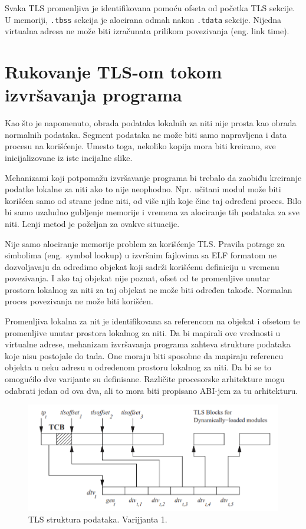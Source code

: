\documentclass[12pt,oneside]{memoir}
\begin{document}
Svaka TLS promenljiva je identifikovana pomoću ofseta od početka TLS sekcije. U memoriji,
\texttt{.tbss} sekcija je alocirana odmah nakon \texttt{.tdata} sekcije. Nijedna virtualna adresa ne
može biti izračunata prilikom povezivanja (eng. link time).

\section{Rukovanje TLS-om tokom izvršavanja programa}

Kao što je napomenuto, obrada podataka lokalnih za niti nije prosta kao obrada normalnih podataka. Segment podataka ne može biti samo napravljena i data procesu na korišćenje. Umesto toga, nekoliko kopija mora biti kreirano, sve inicijalizovane iz iste incijalne slike.

Mehanizami koji potpomažu izvršavanje programa bi trebalo da zaobiđu kreiranje podatke lokalne za niti ako to nije neophodno. Npr. učitani modul može biti korišćen samo od strane jedne niti, od više njih koje čine taj određeni proces. Bilo bi samo uzaludno gubljenje memorije i vremena za alociranje tih podataka za sve niti. Lenji metod je poželjan za ovakve situacije.

Nije samo alociranje memorije problem za korišćenje TLS. Pravila potrage za simbolima (eng.~symbol lookup) u izvršnim fajlovima sa ELF formatom ne dozvoljavaju da odredimo objekat koji sadrži korišćenu definiciju u vremenu povezivanja. I ako taj objekat nije poznat, ofset od te promenljive unutar prostora lokalnog za niti za taj objekat ne može biti određen takođe. Normalan proces povezivanja ne može biti korišćen.

Promenljiva lokalna za nit je identifikovana sa referencom na objekat i ofsetom te promenljive unutar prostora lokalnog za niti. Da bi mapirali ove vrednosti u virtualne adrese, mehanizam izvršavanja programa zahteva strukture podataka koje nisu postojale do tada. One moraju biti sposobne da mapiraju referencu objekta u neku adresu u određenom prostoru lokalnog za niti. Da bi se to omogućilo dve varijante su definisane. Različite procesorske arhitekture mogu odabrati jedan od ova dva, ali to mora biti propisano ABI-jem za tu arhitekturu.

\begin{figure}[h!]
	\begin{center}
		\includegraphics[scale=0.6]{slike/TLSModelV1.png}
	\end{center}
	\caption{TLS struktura podataka. Varijjanta 1.}
	\label{fig:tls_model1}
\end{figure}
\end{document}
